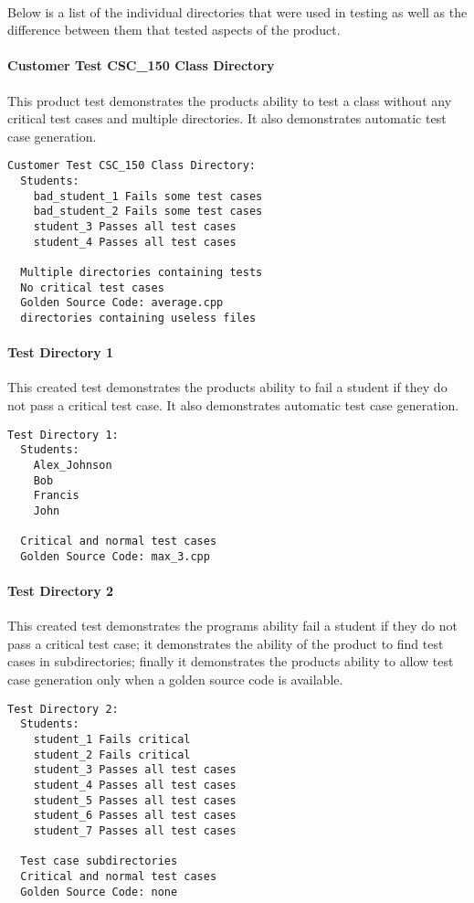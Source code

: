 \paragraph{} Below is a list of the individual directories that were used in testing as well as the difference between them that tested aspects of the product.

\paragraph{Customer Test CSC\_150 Class Directory}
This product test demonstrates the products ability to test a class without any critical test cases and multiple directories. It also demonstrates automatic test case generation.
\begin{verbatim}
Customer Test CSC_150 Class Directory:
  Students:
    bad_student_1 Fails some test cases
    bad_student_2 Fails some test cases
    student_3 Passes all test cases
    student_4 Passes all test cases
    
  Multiple directories containing tests
  No critical test cases
  Golden Source Code: average.cpp
  directories containing useless files
\end{verbatim}

\paragraph{Test Directory 1}
This created test demonstrates the products ability to fail a student if they do not pass a critical test case. It also demonstrates automatic test case generation.
\begin{verbatim}
Test Directory 1:
  Students:
    Alex_Johnson
    Bob
    Francis
    John
    
  Critical and normal test cases
  Golden Source Code: max_3.cpp
\end{verbatim}

\paragraph{Test Directory 2}
This created test demonstrates the programs ability fail a student if they do not pass a critical test case; it demonstrates the ability of the product to find test cases in subdirectories; finally it demonstrates the products ability to allow test case generation only when a golden source code is available.
\begin{verbatim}
Test Directory 2:
  Students:
    student_1 Fails critical
    student_2 Fails critical
    student_3 Passes all test cases
    student_4 Passes all test cases
    student_5 Passes all test cases
    student_6 Passes all test cases
    student_7 Passes all test cases

  Test case subdirectories
  Critical and normal test cases
  Golden Source Code: none
\end{verbatim}

